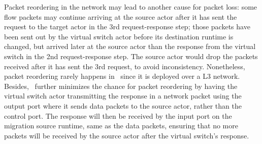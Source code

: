  Packet reordering in the network may lead to another cause for packet loss: some flow packets may continue arriving at the source actor after it has sent the request to the target actor in the 3rd request-response step; those packets have been sent out by the virtual switch actor before its destination runtime is changed, but arrived later at the source actor than the response from the virtual switch in the 2nd request-response step. %
 The source actor would drop the packets received after it has sent the 3rd request, to avoid inconsistency. Nonetheless, packet reordering rarely happens in \nfactor~since it is deployed over a L3 network. Besides, \nfactor~further minimizes the chance for packet reordering by having the virtual switch actor transmitting the response in a network packet using the output port where it sends data packets to the source actor, rather than the control port. The response will then be received by the input port on the migration source runtime, same as the data packets, ensuring that no more packets will be received by the source actor after the virtual switch's response.



